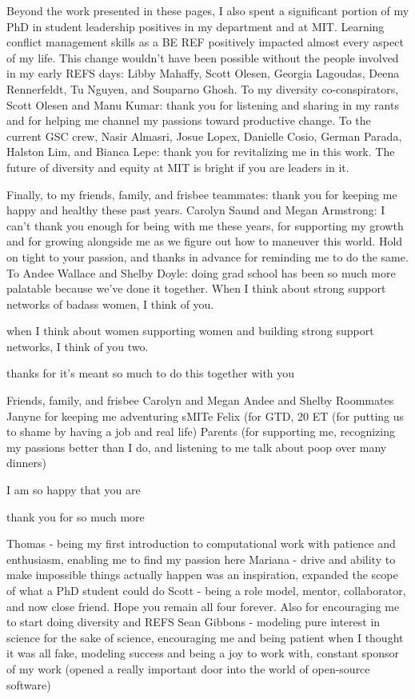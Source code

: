 Beyond the work presented in these pages, I also spent a significant portion of my PhD in student leadership positives in my department and at MIT.
Learning conflict management skills as a BE REF positively impacted almost every aspect of my life.
This change wouldn't have been possible without the people involved in my early REFS days: Libby Mahaffy, Scott Olesen, Georgia Lagoudas, Deena Rennerfeldt, Tu Nguyen, and Souparno Ghosh.
To my diversity co-conspirators, Scott Olesen and Manu Kumar: thank you for listening and sharing in my rants and for helping me channel my passions toward productive change.
To the current GSC crew, Nasir Almasri, Josue Lopex, Danielle Cosio, German Parada, Halston Lim, and Bianca Lepe: thank you for revitalizing me in this work.
The future of diversity and equity at MIT is bright if you are leaders in it.

Finally, to my friends, family, and frisbee teammates: thank you for keeping me happy and healthy these past years.
Carolyn Saund and Megan Armstrong: I can't thank you enough for being with me these years, for supporting my growth and for growing alongside me as we figure out how to maneuver this world.
Hold on tight to your passion, and thanks in advance for reminding me to do the same.
To Andee Wallace and Shelby Doyle: doing grad school has been so much more palatable because we've done it together.
When I think about strong support networks of badass women, I think of you.


when I think about women supporting women and building strong support networks, I think of you two.


thanks for  it's meant so much to do this together with you



Friends, family, and frisbee
Carolyn and Megan
Andee and Shelby
Roommates
Janyne for keeping me adventuring
sMITe
Felix (for GTD, 20%
ET (for putting us to shame by having a job and real life)
Parents (for supporting me, recognizing my passions better than I do, and listening to me talk about poop over many dinners)


I am so happy that you are

thank you for so much more

Thomas - being my first introduction to computational work with patience and enthusiasm, enabling me to find my passion here
Mariana - drive and ability to make impossible things actually happen was an inspiration, expanded the scope of what a PhD student could do
Scott - being a role model, mentor, collaborator, and now close friend. Hope you remain all four forever. Also for encouraging me to start doing diversity and REFS
Sean Gibbons - modeling pure interest in science for the sake of science, encouraging me and being patient when I thought it was all fake, modeling success and being a joy to work with, constant sponsor of my work (opened a really important door into the world of open-source software)


